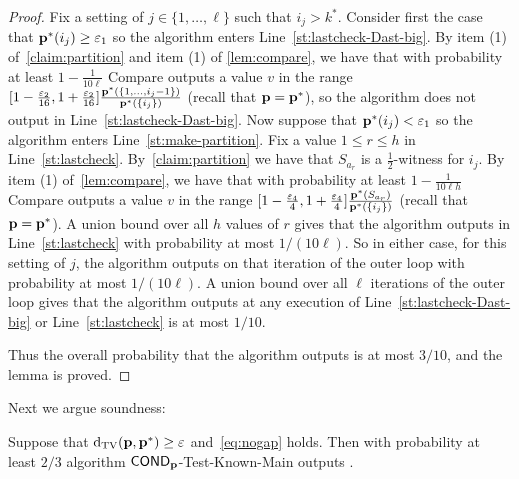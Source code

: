 \begin{proof}
Fix a setting of $j \in \{1,\dots,\ell\}$ such that $i_j > k^\ast.$
Consider first the case
that $\D^\ast(i_j) \geq {\eps_1}$ so the algorithm enters Line~\ref{st:lastcheck-Dast-big}.
By item (1) of~\cref{claim:partition} and item (1) of
\cref{lem:compare}, we have that
with probability at least $1 - {\frac{1}{10 \ell}}$
{\sc Compare} outputs a value $v$ in the range $[1-{\frac {{\varepsilon_2}}{16}},
1+{\frac {{\varepsilon_2}}{16}}]{\frac {\ensuremath{\mathbf{p}}^\ast(\{1,\dots,i_j-1\})}
{\ensuremath{\mathbf{p}}^\ast(\{i_j\})}}$ (recall that $\mathbf{p} = \mathbf{p}^\ast$),
so the algorithm does not output \reject in Line~\ref{st:lastcheck-Dast-big}.
Now suppose that $\mathbf{p}^\ast(i_j) < {\varepsilon_1}$ so the algorithm enters Line~\ref{st:make-partition}.
Fix a value $1 \leq r \leq {h}$ in Line~\ref{st:lastcheck}.  By~\cref{claim:partition} we have
that $S_{a_r}$ is a ${\frac{1}2}$-\good witness for $i_j.$  By item (1) of~\cref{lem:compare}, we have that with probability at least $1 - {\frac{1}{10 \ell h}}$
{\sc Compare} outputs a value $v$ in the range $[1-{\frac{\varepsilon_4}{4}},1+{\frac{\varepsilon_4}{4}}]{\frac {\ensuremath{\mathbf{p}}^\ast(S_{a_r})}
{\ensuremath{\mathbf{p}}^\ast(\{i_j\})}}$ (recall that $\mathbf{p} = \mathbf{p}^\ast$).
 A union bound over all $h$ values of
$r$ gives that the algorithm
outputs \reject in Line~\ref{st:lastcheck} with probability at most $1/(10 \ell).$
So in either case, for this setting of $j$, the algorithm outputs \reject on that iteration
of the outer loop with probability at most $1/(10\ell).$  A union bound over all
$\ell$ iterations of the outer loop gives that the algorithm outputs \reject at any
execution of Line~\ref{st:lastcheck-Dast-big} or Line~\ref{st:lastcheck} is at most $1/10.$

Thus the overall probability that the algorithm outputs \reject is at most $3/10$, and the lemma is proved.
\end{proof}

Next we argue soundness:
\begin{lemma} \label{lem:CKTM-sound}
Suppose that $\operatorname{d}_{\textrm{TV}}(\mathbf{p},\mathbf{p}^\ast) \geq \varepsilon$ and~\cref{eq:nogap} holds.  Then with probability
at least $2/3$ algorithm {\sc ${\sf COND}_{\mathbf{p}}$-Test-Known-Main} outputs \reject.
\end{lemma}

